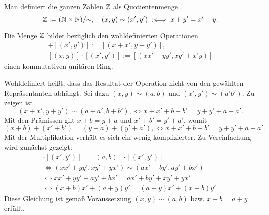\begin{Definition}\newlinefirst
Man definiert die ganzen Zahlen $\mathbb Z$ als Quotientenmenge
\[\mathbb Z := (\mathbb N\times\mathbb N)/{\sim},\quad (x,y)\sim (x',y')\;:\Longleftrightarrow\; x+y' = x'+y.\]
\end{Definition}

\begin{Satz}
Die Menge $\mathbb Z$ bildet bezüglich den wohldefinierten Operationen
\begin{gather*}
[(x,y)] + [(x',y')] := [(x+x',y+y')],\\
[(x,y)]\cdot [(x',y')] := [(xx'+yy',xy'+x'y)]
\end{gather*}
einen kommutativen unitären Ring.
\end{Satz}
\begin{Beweis}
Wohldefiniert heißt, dass das Resultat der Operation nicht von den
gewählten Repräsentanten abhängt. Sei dazu $(x,y)\sim (a,b)$ und
$(x',y')\sim (a'b')$. Zu zeigen ist%
\[(x+x',y+y') \sim (a+a',b+b'), \iff x+x'+b+b' = y+y'+a+a'.\]
Mit den Prämissen gilt $x+b=y+a$ und $x'+b'=y'+a'$, womit
\[(x+b)+(x'+b') = (y+a)+(y'+a'), \iff x+x'+b+b' = y+y'+a+a'.\]
Mit der Multiplikation verhält es sich ein wenig komplizierter.
Zu Vereinfachung wird zunächst gezeigt:
\begin{gather*}
[(x,y)]\cdot [(x',y')] = [(a,b)]\cdot [(x',y')]\\
\iff (xx'+yy',xy'+yx')\sim (ax'+by',ay'+bx')\\
\iff xx'+yy' + ay'+bx' = ax'+by' + xy'+yx'\\
\iff (x+b)x' + (a+y)y' = (a+y)x' + (x+b)y'.
\end{gather*}
Diese Gleichung ist gemäß Voraussetzung $(x,y)\sim (a,b)$
bzw. $x+b=a+y$ erfüllt.


\end{Beweis}
